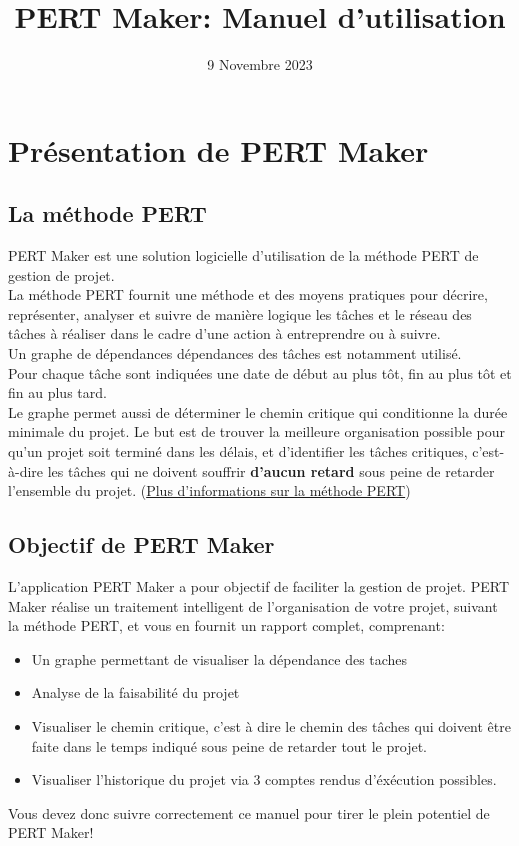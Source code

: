 \documentclass{article}
\title{\centering PERT Maker: Manuel d'utilisation}
\date{9 Novembre 2023}
\begin{document}
    
    
\maketitle
\tableofcontents{}
\newpage

\section{Présentation de PERT Maker}
\subsection{La méthode PERT}
PERT Maker est une solution logicielle d'utilisation de la méthode PERT de gestion de projet. \\
La méthode PERT fournit une méthode et des moyens pratiques pour décrire,
représenter, analyser et suivre de manière logique les tâches et le réseau des tâches à réaliser dans le cadre d'une 
action à entreprendre ou à suivre. \\
Un graphe de dépendances dépendances des tâches est notamment utilisé. \\
Pour chaque tâche sont indiquées une date de début au plus tôt, fin au plus tôt et fin au plus tard.  \\
Le graphe permet aussi de déterminer le chemin critique qui conditionne la durée minimale du projet.
Le but est de trouver la meilleure organisation possible pour qu'un projet soit terminé dans les délais, et d'identifier les tâches critiques, 
c'est-à-dire les tâches qui ne doivent souffrir \textbf{d'aucun retard} sous peine de retarder l'ensemble du projet.
(\textcolor{blue}{\href{https://fr.wikipedia.org/wiki/PERT}{Plus d'informations sur la méthode PERT}})


\subsection{Objectif de PERT Maker}

L'application PERT Maker a pour objectif de faciliter la gestion de projet. PERT Maker réalise un traitement intelligent de l'organisation de votre projet, suivant 
la méthode PERT, et vous en fournit un rapport complet, comprenant:
\begin{itemize}
    \item Un graphe permettant de visualiser la dépendance des taches
    \item Analyse de la faisabilité du projet
    \item Visualiser le chemin critique, c'est à dire le chemin des tâches qui doivent être faite dans le temps indiqué sous peine de retarder tout le projet.
    \item Visualiser l'historique du projet via 3 comptes rendus d'éxécution possibles.
\end{itemize} 
Vous devez donc suivre correctement ce manuel pour tirer le plein potentiel de PERT Maker!
\end{document}
